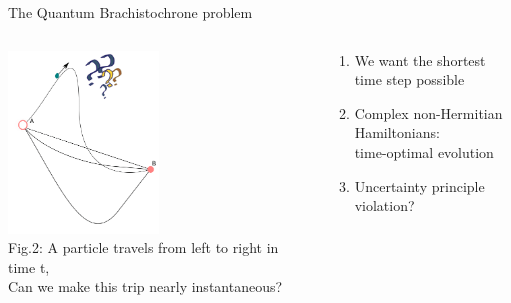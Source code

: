 \documentclass[10pt]{beamer}
\begin{document}
\begin{frame}{The Quantum Brachistochrone problem}
\vspace{0.5cm}
\begin{columns}
    \hspace{1.5em}
    \begin{column}{\textwidth}
    \includegraphics[width=0.5\textwidth]{optim-gif/optimisation-6}
    \\
    \hspace{1em}
    \tiny{Fig.2:
    A particle travels from left to right in time t,\\
    \hspace{2.4em}
    Can we make this trip nearly instantaneous?}
    \end{column}

    \hspace{-17em}
    \begin{column}{0.5\textwidth}
    \begin{enumerate}
        \item We want the shortest time step possible
        \pause
        \item \textcolor{myNewColorC}{Complex non-Hermitian Hamiltonians:\\ \quad time-optimal evolution}
        \pause
        \item \textcolor{myNewColorD}{Uncertainty principle violation?}
        \vspace{1cm}
    \end{enumerate}
    \end{column}
    \end{columns}
\end{frame}
\end{document}
